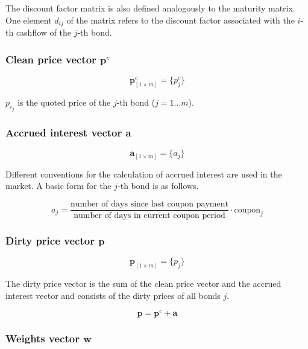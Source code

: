  The discount factor matrix is also defined analogously to the maturity matrix. One element $d_{ij}$ of the matrix refers to the discount factor associated with  the $i$-th cashflow of the $j$-th bond.

\subsubsection*{Clean price vector $\bm{p}^c$}

 \begin{equation}\label{pc}
\bm{p}^c_{\left[1\times m\right]}= \{p^c_j\}
\end{equation}

$p_{c_j}$ is the quoted price of the $j$-th bond ($j=1...m$).

\subsubsection*{Accrued interest vector $\bm{a}$}

  \begin{equation}\label{a}
\bm{a}_{\left[1\times m\right]}= \{a_j\}
\end{equation}

Different conventions for the calculation of accrued interest are used in the market. A basic form for the $j$-th bond is as follows.

\begin{equation}
    a_j= \frac{\mbox{number of days since last coupon payment}}{\mbox{number of days in current coupon period}}\cdot \mbox{coupon}_j
\end{equation}
 	

\subsubsection*{Dirty price vector $\bm{p}$}

\begin{equation}\label{pd}
    \bm{p}_{\left[1\times m\right]}= \{p_j\}
\end{equation}

The dirty price vector is the sum of the clean price vector and the accrued interest vector and consists of the dirty prices of all bonds $j$.

\begin{displaymath}
\bm{p}=\bm{p}^c+\bm{a}
\end{displaymath}

\subsubsection*{Weights vector $\bm{w}$}


